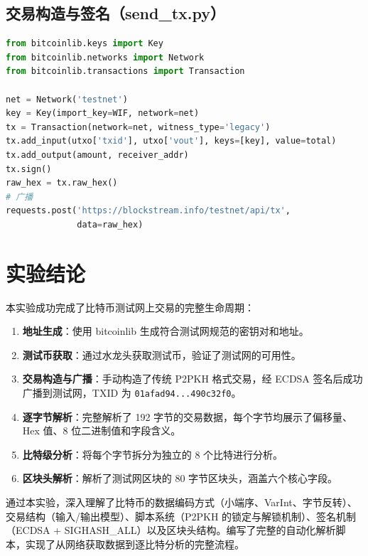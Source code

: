 \documentclass[12pt,a4paper]{ctexart}
\begin{document}
\subsection{交易构造与签名（send\_tx.py）}

\begin{lstlisting}[language=Python, caption=构造并发送交易]
from bitcoinlib.keys import Key
from bitcoinlib.networks import Network
from bitcoinlib.transactions import Transaction

net = Network('testnet')
key = Key(import_key=WIF, network=net)
tx = Transaction(network=net, witness_type='legacy')
tx.add_input(utxo['txid'], utxo['vout'], keys=[key], value=total)
tx.add_output(amount, receiver_addr)
tx.sign()
raw_hex = tx.raw_hex()
# 广播
requests.post('https://blockstream.info/testnet/api/tx',
              data=raw_hex)
\end{lstlisting}

\section{实验结论}

本实验成功完成了比特币测试网上交易的完整生命周期：

\begin{enumerate}
    \item \textbf{地址生成}：使用 bitcoinlib 生成符合测试网规范的密钥对和地址。
    \item \textbf{测试币获取}：通过水龙头获取测试币，验证了测试网的可用性。
    \item \textbf{交易构造与广播}：手动构造了传统 P2PKH 格式交易，经 ECDSA 签名后成功广播到测试网，TXID 为 \texttt{01afad94...490c32f0}。
    \item \textbf{逐字节解析}：完整解析了 192 字节的交易数据，每个字节均展示了偏移量、Hex 值、8 位二进制值和字段含义。
    \item \textbf{比特级分析}：将每个字节拆分为独立的 8 个比特进行分析。
    \item \textbf{区块头解析}：解析了测试网区块的 80 字节区块头，涵盖六个核心字段。
\end{enumerate}

通过本实验，深入理解了比特币的数据编码方式（小端序、VarInt、字节反转）、交易结构（输入/输出模型）、脚本系统（P2PKH 的锁定与解锁机制）、签名机制（ECDSA + SIGHASH\_ALL）以及区块头结构。编写了完整的自动化解析脚本，实现了从网络获取数据到逐比特分析的完整流程。
\end{document}
